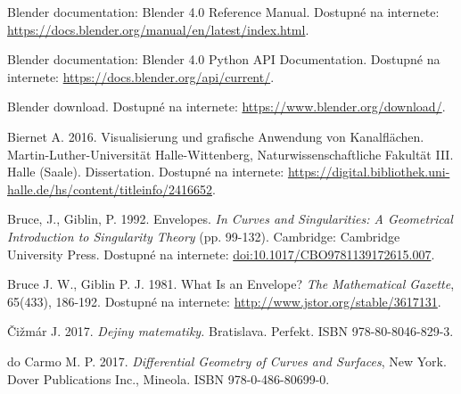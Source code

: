 \documentclass[12pt, twoside]{book}
\theoremstyle{definition}
\begin{document}




\newpage	

\backmatter

\thispagestyle{empty}
\nocite{*}
\clearpage


% 

\begin{thebibliography}{99}


 Blender documentation: Blender 4.0 Reference Manual. Dostupné na internete: \url{https://docs.blender.org/manual/en/latest/index.html}.

 Blender documentation: Blender 4.0 Python API Documentation. Dostupné na internete: \url{https://docs.blender.org/api/current/}.

 Blender download. Dostupné na internete: \url{https://www.blender.org/download/}.

 Biernet A. 2016. Visualisierung und grafische Anwendung von Kanalflächen. Martin-Luther-Universität Halle-Wittenberg, Naturwissenschaftliche Fakultät III. Halle (Saale). Dissertation. Dostupné na internete: \url{https://digital.bibliothek.uni-halle.de/hs/content/titleinfo/2416652}.

 Bruce, J., Giblin, P. 1992. Envelopes. \textit{In Curves and Singularities: A Geometrical Introduction to Singularity Theory} (pp. 99-132). Cambridge: Cambridge University Press. Dostupné na internete: \url{doi:10.1017/CBO9781139172615.007}.

 Bruce J. W., Giblin P. J. 1981. What Is an Envelope? \textit{The Mathematical Gazette}, 65(433), 186-192. Dostupné na internete: \url{http://www.jstor.org/stable/3617131}.

 Čižmár J. 2017. \textit{Dejiny matematiky.} Bratislava. Perfekt. ISBN 978-80-8046-829-3.

 do Carmo M. P. 2017. \textit{Differential Geometry of Curves and Surfaces}, New York. Dover Publications Inc., Mineola. ISBN 978-0-486-80699-0.


\end{thebibliography}
\end{document}
